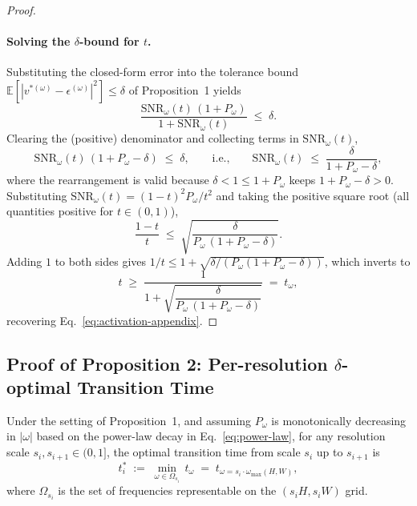 \begin{proof}
\leavevmode

\paragraph{Solving the $\delta$-bound for $t$.} Substituting the closed-form error into the tolerance bound $\mathbb{E}[|v^{*(\omega)} - \epsilon^{(\omega)}|^2] \le \delta$ of Proposition~1 yields
\begin{equation}
  \frac{\mathrm{SNR}_\omega(t)\,(1 + P_\omega)}{1 + \mathrm{SNR}_\omega(t)} \;\le\; \delta.
\end{equation}
Clearing the (positive) denominator and collecting terms in $\mathrm{SNR}_\omega(t)$,
\begin{equation}
  \mathrm{SNR}_\omega(t)\,(1 + P_\omega - \delta) \;\le\; \delta,
  \qquad \text{i.e.,} \qquad
  \mathrm{SNR}_\omega(t) \;\le\; \frac{\delta}{1 + P_\omega - \delta},
\end{equation}
where the rearrangement is valid because $\delta < 1 \le 1 + P_\omega$ keeps $1 + P_\omega - \delta > 0$. Substituting $\mathrm{SNR}_\omega(t) = (1-t)^2 P_\omega / t^2$ and taking the positive square root (all quantities positive for $t \in (0, 1)$),
\begin{equation}
  \frac{1-t}{t} \;\le\; \sqrt{\frac{\delta}{P_\omega\,(1 + P_\omega - \delta)}}.
\end{equation}
Adding $1$ to both sides gives $1/t \le 1 + \sqrt{\delta / (P_\omega(1 + P_\omega - \delta))}$, which inverts to
\begin{equation}
  t \;\ge\; \frac{1}{1 + \sqrt{\dfrac{\delta}{P_\omega\,(1 + P_\omega - \delta)}}} \;=\; t_\omega,
\end{equation}
recovering Eq.~\eqref{eq:activation-appendix}.
\end{proof}


\subsection{Proof of Proposition 2: Per-resolution $\delta$-optimal Transition Time}
\label{app:proof-prop2}

\begin{proposition} Under the setting of Proposition~1, and assuming $P_\omega$ is monotonically decreasing in $|\omega|$ based on the power-law decay in Eq.~\eqref{eq:power-law}, for any resolution scale $s_i, s_{i+1} \in (0, 1]$, the optimal transition time from scale $s_i$ up to $s_{i+1}$ is
\begin{equation}
  t_i^* \;:=\; \min_{\omega \in \Omega_{s_i}}\, t_\omega \;=\; t_{\omega=s_i \cdot \omega_{\max}(H,W)},
  \label{eq:stage-transition-appendix}
\end{equation}
where $\Omega_{s_i}$ is the set of frequencies representable on the $(s_iH, s_iW)$ grid.
\end{proposition}

